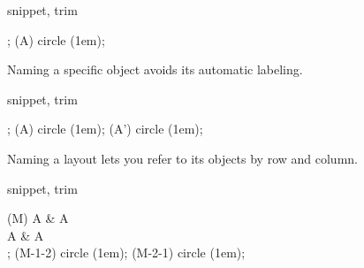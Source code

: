 \begin{tcblisting}{snippet, trim}
\begin{kodi}[square=3em]
;
\draw (A) circle (1em);
\end{kodi}
\end{tcblisting}

Naming a specific object avoids its automatic labeling.

\begin{tcblisting}{snippet, trim}
\begin{kodi}[square=3em]
;
\draw [red]   (A)  circle (1em);
\draw [green] (A') circle (1em);
\end{kodi}
\end{tcblisting}

Naming a layout lets you refer to its objects by row and column.

\begin{tcblisting}{snippet, trim}
\begin{kodi}[square=3em]
\obj (M) { A & A \\ A & A \\ };
\draw [red]   (M-1-2) circle (1em);
\draw [green] (M-2-1) circle (1em);
\end{kodi}
\end{tcblisting}
